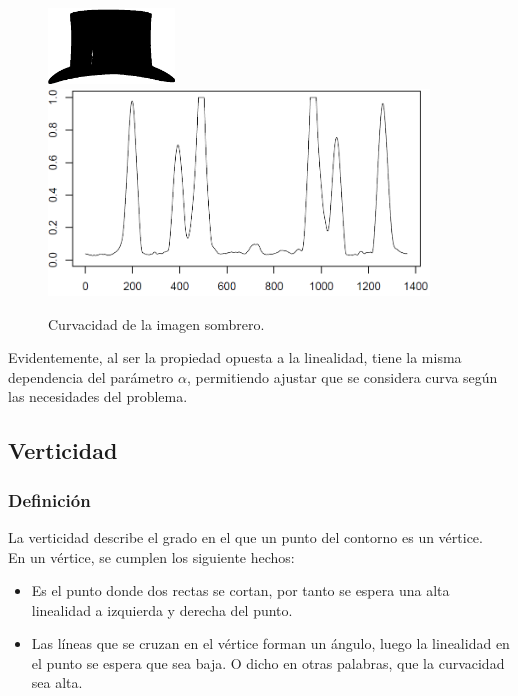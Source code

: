 \begin{figure}[H]
\begin{center}

\includegraphics[width=0.3\textwidth]{img/hat-7.png}
\newline
\includegraphics[width=0.9\textwidth]{img/nolin-hat-7.png}
\end{center}

\caption{Curvacidad de la imagen sombrero.}
\label{fig10}
\end{figure}


Evidentemente, al ser la propiedad opuesta a la linealidad, tiene la misma dependencia del parámetro $\alpha$, permitiendo ajustar que se considera curva según las necesidades del problema.\\

\subsection{Verticidad}

\subsubsection{Definición}
La verticidad describe el grado en el que un punto del contorno es un vértice.\\

En un vértice, se cumplen los siguiente hechos:
\begin{itemize}
\item Es el punto donde dos rectas se cortan, por tanto se espera una alta linealidad a izquierda y derecha del punto.
\item Las líneas que se cruzan en el vértice forman un ángulo, luego la linealidad en el punto se espera que sea baja. O dicho en otras palabras, que la curvacidad sea alta.
\end{itemize}

